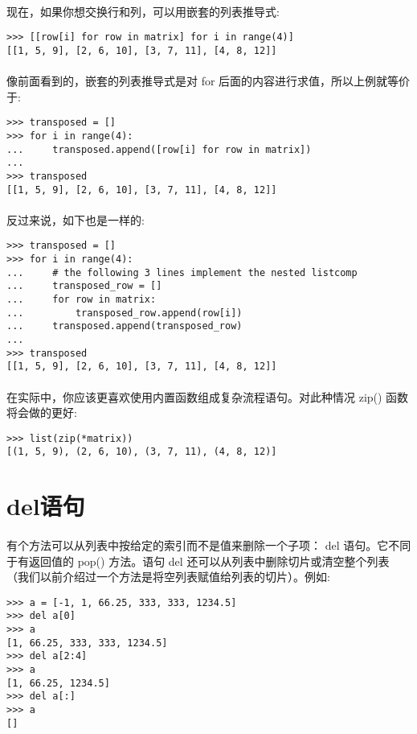 \documentclass{article}
\begin{document}
\begin{CJK}{UTF8}{gbsn}
\paragraph{}
现在，如果你想交换行和列，可以用嵌套的列表推导式:
\begin{verbatim}
>>> [[row[i] for row in matrix] for i in range(4)]
[[1, 5, 9], [2, 6, 10], [3, 7, 11], [4, 8, 12]]
\end{verbatim}
\paragraph{}
像前面看到的，嵌套的列表推导式是对 for 后面的内容进行求值，所以上例就等价于:
\begin{verbatim}
>>> transposed = []
>>> for i in range(4):
...     transposed.append([row[i] for row in matrix])
...
>>> transposed
[[1, 5, 9], [2, 6, 10], [3, 7, 11], [4, 8, 12]]
\end{verbatim}
\paragraph{}
反过来说，如下也是一样的:
\begin{verbatim}
>>> transposed = []
>>> for i in range(4):
...     # the following 3 lines implement the nested listcomp
...     transposed_row = []
...     for row in matrix:
...         transposed_row.append(row[i])
...     transposed.append(transposed_row)
...
>>> transposed
[[1, 5, 9], [2, 6, 10], [3, 7, 11], [4, 8, 12]]
\end{verbatim}
\paragraph{}
在实际中，你应该更喜欢使用内置函数组成复杂流程语句。对此种情况 zip() 函数将会做的更好:
\begin{verbatim}
>>> list(zip(*matrix))
[(1, 5, 9), (2, 6, 10), (3, 7, 11), (4, 8, 12)]
\end{verbatim}
\section{del语句}
\paragraph{}
有个方法可以从列表中按给定的索引而不是值来删除一个子项： del 语句。它不同于有返回值的 pop() 方法。语句 del 还可以从列表中删除切片或清空整个列表（我们以前介绍过一个方法是将空列表赋值给列表的切片）。例如:
\begin{verbatim}
>>> a = [-1, 1, 66.25, 333, 333, 1234.5]
>>> del a[0]
>>> a
[1, 66.25, 333, 333, 1234.5]
>>> del a[2:4]
>>> a
[1, 66.25, 1234.5]
>>> del a[:]
>>> a
[]
\end{verbatim}

\end{CJK}
\end{document}

